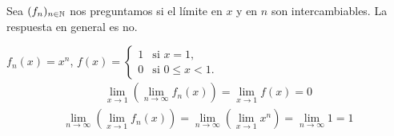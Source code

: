 \begin{note}
  Sea $(f_n)_{n \in \mathbb{N}}$ nos preguntamos si el límite en $x$ y en $n$ son intercambiables. La respuesta en general es no.
\end{note}

\begin{eg}
  $f_n(x) = x^n$, $f(x) = \begin{cases}
      1 & \text{si } x = 1,        \\
      0 & \text{si } 0 \leq x < 1.
    \end{cases}$ \begin{align*}
    \lim_{x \to 1} \left(\lim_{n \to \infty} f_n(x)\right) = \lim_{x \to 1} f(x) = 0
  \end{align*}
  \begin{align*}
    \lim_{n \to \infty} \left(\lim_{x \to 1} f_n(x)\right) = \lim_{n \to \infty} \left(\lim_{x \to 1} x^n\right) = \lim_{n \to \infty} 1 = 1
  \end{align*}
\end{eg}

\clearpage

